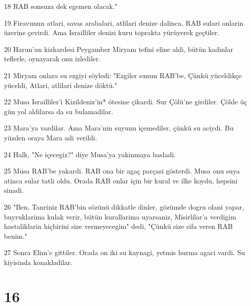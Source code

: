 \par 18 RAB sonsuza dek egemen olacak."
\par 19 Firavunun atlari, savas arabalari, atlilari denize dalinca, RAB sulari onlarin üzerine çevirdi. Ama Israilliler denizi kuru toprakta yürüyerek geçtiler.
\par 20 Harun'un kizkardesi Peygamber Miryam tefini eline aldi, bütün kadinlar teflerle, oynayarak onu izlediler.
\par 21 Miryam onlara su ezgiyi söyledi: "Ezgiler sunun RAB'be, Çünkü yüceldikçe yüceldi, Atlari, atlilari denize döktü."
\par 22 Musa Israilliler'i Kizildeniz'in* ötesine çikardi. Sur Çölü'ne girdiler. Çölde üç gün yol aldilarsa da su bulamadilar.
\par 23 Mara'ya vardilar. Ama Mara'nin suyunu içemediler, çünkü su aciydi. Bu yüzden oraya Mara adi verildi.
\par 24 Halk, "Ne içecegiz?" diye Musa'ya yakinmaya basladi.
\par 25 Musa RAB'be yakardi. RAB ona bir agaç parçasi gösterdi. Musa onu suya atinca sular tatli oldu. Orada RAB onlar için bir kural ve ilke koydu, hepsini sinadi.
\par 26 "Ben, Tanriniz RAB'bin sözünü dikkatle dinler, gözümde dogru olani yapar, buyruklarima kulak verir, bütün kurallarima uyarsaniz, Misirlilar'a verdigim hastaliklarin hiçbirini size vermeyecegim" dedi, "Çünkü size sifa veren RAB benim."
\par 27 Sonra Elim'e gittiler. Orada on iki su kaynagi, yetmis hurma agaci vardi. Su kiyisinda konakladilar.

\chapter{16}

